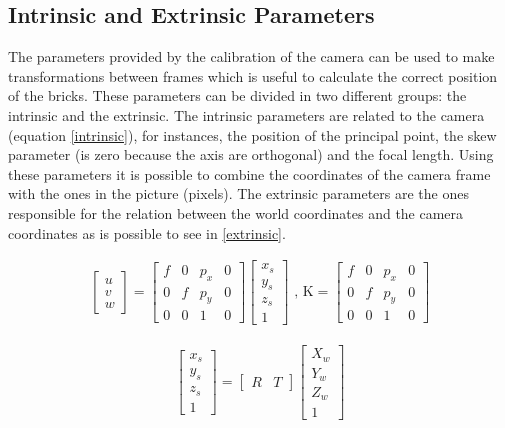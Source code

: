 \subsection*{Intrinsic and Extrinsic Parameters}
The parameters provided by the calibration of the camera can be used to make transformations between frames which is useful to calculate the correct position of the bricks. These parameters can be divided in two different groups: the intrinsic and the extrinsic. The intrinsic parameters are related to the camera (equation \ref{intrinsic}), for instances, the position of the principal point, the skew parameter (is zero because the axis are orthogonal) and the focal length. Using these parameters it is possible to combine the coordinates of the camera frame with the ones in the picture (pixels). The extrinsic parameters are the ones responsible for the relation between the world coordinates and the camera coordinates as is possible to see in \ref{extrinsic}.

\begin{align} 
\label{intrinsic}
\begin{bmatrix}
    \textit{u} \\ 
    \textit{v} \\
    \textit{w} 
\end{bmatrix}
=
\begin{bmatrix}
    \textit{f}  & 0 & p_{x} & 0\\
    0   &  \textit{f} & p_{y} & 0  \\
    0 & 0 & 1 & 0 
\end{bmatrix}
\begin{bmatrix}
   x_{s}\\
   y_{s}\\
   z_{s}\\
	1
\end{bmatrix}
\text{  , K}
=
\begin{bmatrix}
    \textit{f}  & 0 & p_{x} & 0\\
    0   &  \textit{f} & p_{y} & 0  \\
    0 & 0 & 1 & 0 
\end{bmatrix}
\end{align}

\begin{align} 
\label{extrinsic}
\begin{bmatrix}
   x_{s}\\
   y_{s}\\
   z_{s}\\
	1
\end{bmatrix}
=
\begin{bmatrix}
    \textit{R}  & \textit{T}
\end{bmatrix}
\begin{bmatrix}
   X_{w}\\
   Y_{w}\\
   Z_{w}\\
	1
\end{bmatrix}
\end{align}

